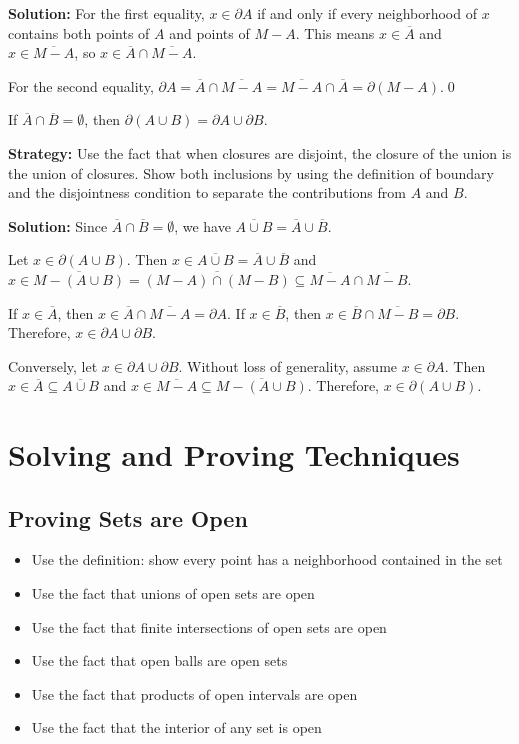 \bigskip\noindent\textbf{Solution:} For the first equality, $x \in \partial A$ if and only if every neighborhood of $x$ contains both points of $A$ and points of $M - A$. This means $x \in \overline{A}$ and $x \in \overline{M - A}$, so $x \in \overline{A} \cap \overline{M - A}$.

For the second equality, $\partial A = \overline{A} \cap \overline{M - A} = \overline{M - A} \cap \overline{A} = \partial(M - A)$.\qed


\begin{problembox}
If \(\overline{A} \cap \overline{B} = \emptyset\), then \(\partial(A \cup B) = \partial A \cup \partial B\).
\end{problembox}

\noindent\textbf{Strategy:} Use the fact that when closures are disjoint, the closure of the union is the union of closures. Show both inclusions by using the definition of boundary and the disjointness condition to separate the contributions from $A$ and $B$.

\bigskip\noindent\textbf{Solution:} Since $\overline{A} \cap \overline{B} = \emptyset$, we have $\overline{A \cup B} = \overline{A} \cup \overline{B}$.

Let $x \in \partial(A \cup B)$. Then $x \in \overline{A \cup B} = \overline{A} \cup \overline{B}$ and $x \in \overline{M - (A \cup B)} = \overline{(M - A) \cap (M - B)} \subseteq \overline{M - A} \cap \overline{M - B}$.

If $x \in \overline{A}$, then $x \in \overline{A} \cap \overline{M - A} = \partial A$. If $x \in \overline{B}$, then $x \in \overline{B} \cap \overline{M - B} = \partial B$. Therefore, $x \in \partial A \cup \partial B$.

Conversely, let $x \in \partial A \cup \partial B$. Without loss of generality, assume $x \in \partial A$. Then $x \in \overline{A} \subseteq \overline{A \cup B}$ and $x \in \overline{M - A} \subseteq \overline{M - (A \cup B)}$. Therefore, $x \in \partial(A \cup B)$.


\section{Solving and Proving Techniques}

\subsection*{Proving Sets are Open}
\begin{itemize}
\item Use the definition: show every point has a neighborhood contained in the set
\item Use the fact that unions of open sets are open
\item Use the fact that finite intersections of open sets are open
\item Use the fact that open balls are open sets
\item Use the fact that products of open intervals are open
\item Use the fact that the interior of any set is open
\end{itemize}

